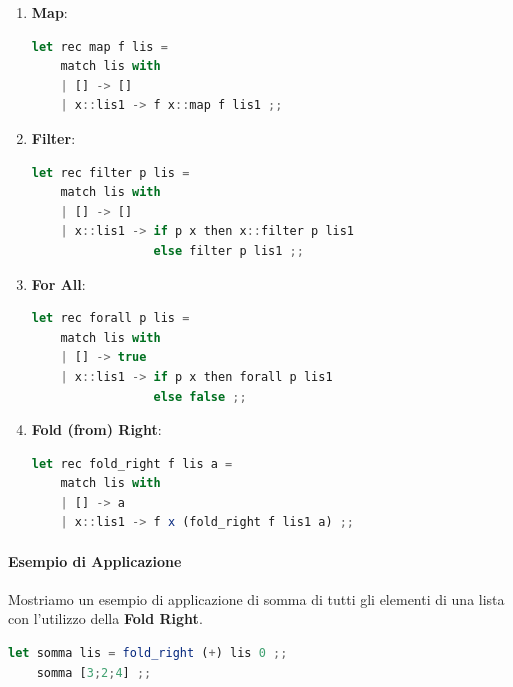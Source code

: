 \documentclass{article}
\begin{document}
\begin{enumerate}
\item \textbf{Map}:
\vspace*{10px}
\begin{lstlisting}[language = JavaScript]
let rec map f lis =
    match lis with
    | [] -> []
    | x::lis1 -> f x::map f lis1 ;;
\end{lstlisting}

\vspace*{-20px}

\item \textbf{Filter}:
\vspace*{10px}
\begin{lstlisting}[language = JavaScript]
let rec filter p lis =
    match lis with
    | [] -> []
    | x::lis1 -> if p x then x::filter p lis1
                 else filter p lis1 ;;
\end{lstlisting}

\vspace*{-20px}

\item \textbf{For All}:
\vspace*{10px}
\begin{lstlisting}[language = JavaScript]
let rec forall p lis =
    match lis with
    | [] -> true
    | x::lis1 -> if p x then forall p lis1
                 else false ;;
\end{lstlisting}

\vspace*{-20px}

\item \textbf{Fold (from) Right}:
\vspace*{10px}
\begin{lstlisting}[language = JavaScript]
let rec fold_right f lis a =
    match lis with
    | [] -> a
    | x::lis1 -> f x (fold_right f lis1 a) ;;
\end{lstlisting}

\vspace*{-20px}
\end{enumerate}

\paragraph{Esempio di Applicazione} Mostriamo un esempio di applicazione di somma di tutti gli elementi di una lista con l'utilizzo della \textbf{Fold Right}.

\vspace*{10px}
\begin{lstlisting}[language = JavaScript]
    let somma lis = fold_right (+) lis 0 ;;
    somma [3;2;4] ;;
\end{lstlisting}
\end{document}
